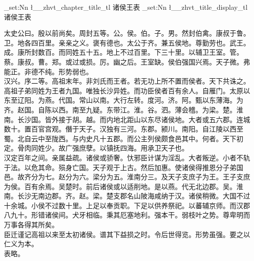 \documentclass{zhvt-classic}
\begin{document}
\clearpage
\ExplSyntaxOn
\tl_set:Nn \l__zhvt_chapter_title_tl { 诸侯王表 }
\tl_set:Nn \l__zhvt_title_display_tl { 诸侯王表 }
\ExplSyntaxOff
\maketitle






\hspace*{2em}太史公曰。殷以前尚矣。周封五等。公。侯。伯。子。男。然封伯禽。康叔于鲁。卫。地各四百里。亲亲之义。褒有德也。太公于齐。兼五侯地。尊勤劳也。武王。成。康所封数百。而同姓五十五。地上不过百里。下三十里。以辅卫王室。管。蔡。康叔。曹。郑。或过或损。厉。幽之后。王室缺。侯伯强国兴焉。天子微。弗能正。非德不纯。形势弱也。\\
\hspace*{2em}汉兴。序二等。高祖末年。非刘氏而王者。若无功上所不置而侯者。天下共诛之。高祖子弟同姓为王者九国。唯独长沙异姓。而功臣侯者百有余人。自雁门。太原以东至辽阳。为燕。代国。常山以南。大行左转。度河。济。阿。甄以东薄海。为齐。赵国。自陈以西。南至九疑。东带江。淮。谷。泗。薄会稽。为梁。楚。淮南。长沙国。皆外接于胡。越。而内地北距山以东尽诸侯地。大者或五六郡。连城数十。置百官宫观。僭于天子。汉独有三河。东郡。颍川。南阳。自江陵以西至蜀。北自云中至陇西。与内史凡十五郡。而公主列侯颇食邑其中。何者。天下初定。骨肉同姓少。故广强庶孽。以镇抚四海。用承卫天子也。\\
\hspace*{2em}汉定百年之间。亲属益疏。诸侯或骄奢。忕邪臣计谋为淫乱。大者叛逆。小者不轨于法。以危其命。殒身亡国。天子观于上古。然后加惠。使诸侯得推恩分子弟国邑。故齐分为七。赵分为六。梁分为五。淮南分三。及天子支庶子为王。王子支庶为侯。百有余焉。吴楚时。前后诸侯或以适削地。是以燕。代无北边郡。吴。淮南。长沙无南边郡。齐。赵。梁。楚支郡名山陂海咸纳于汉。诸侯稍微。大国不过十余城。小侯不过数十里。上足以奉贡职。下足以供养祭祀。以蕃辅京师。而汉郡八九十。形错诸侯间。犬牙相临。秉其厄塞地利。强本干。弱枝叶之势。尊卑明而万事各得其所矣。\\
\hspace*{2em}臣迁谨记高祖以来至太初诸侯。谱其下益损之时。令后世得览。形势虽强。要之以仁义为本。\\
\hspace*{2em}表略。\\
\end{document}
